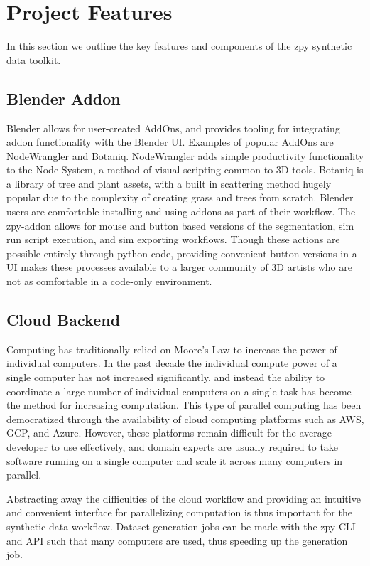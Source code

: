 \documentclass{article}
\begin{document}
\section{Project Features}
\label{sec:projectfeatures}

In this section we outline the key features and components of the zpy synthetic data toolkit.

\subsection{Blender Addon}
\label{sec:blenderaddon}

Blender allows for user-created AddOns, and provides tooling for integrating addon functionality with the Blender UI. Examples of popular AddOns are NodeWrangler and Botaniq. NodeWrangler adds simple productivity functionality to the Node System, a method of visual scripting common to 3D tools. Botaniq is a library of tree and plant assets, with a built in scattering method hugely popular due to the complexity of creating grass and trees from scratch. Blender users are comfortable installing and using addons as part of their workflow. The zpy-addon allows for mouse and button based versions of the segmentation, sim run script execution, and sim exporting workflows. Though these actions are possible entirely through python code, providing convenient button versions in a UI makes these processes available to a larger community of 3D artists who are not as comfortable in a code-only environment.

\subsection{Cloud Backend}
\label{sec:cloudbackend}

Computing has traditionally relied on Moore’s Law to increase the power of individual computers. In the past decade the individual compute power of a single computer has not increased significantly, and instead the ability to coordinate a large number of individual computers on a single task has become the method for increasing computation. This type of parallel computing has been democratized through the availability of cloud computing platforms such as AWS, GCP, and Azure. However, these platforms remain difficult for the average developer to use effectively, and domain experts are usually required to take software running on a single computer and scale it across many computers in parallel.

Abstracting away the difficulties of the cloud workflow and providing an intuitive and convenient interface for parallelizing computation is thus important for the synthetic data workflow. Dataset generation jobs can be made with the zpy CLI and API such that many computers are used, thus speeding up the generation job.
\end{document}
